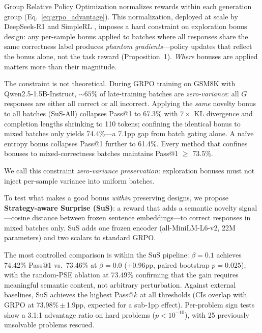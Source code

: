 \documentclass[10pt]{article}
\begin{document}
Group Relative Policy Optimization \citep[GRPO;][]{shao2024deepseekmath} normalizes rewards within each generation group (Eq.~\ref{eq:grpo_advantage}). This normalization, deployed at scale by DeepSeek-R1 \citep{guo2025deepseek} and SimpleRL \citep{zeng2025simplerl}, imposes a hard constraint on exploration bonus design: any per-sample bonus applied to batches where all responses share the same correctness label produces \emph{phantom gradients}---policy updates that reflect the bonus alone, not the task reward (Proposition~1). \emph{Where} bonuses are applied matters more than their magnitude.

The constraint is not theoretical. During GRPO training on GSM8K with Qwen2.5-1.5B-Instruct, ${\sim}65\%$ of late-training batches are \emph{zero-variance}: all $G$ responses are either all correct or all incorrect. Applying the \emph{same} novelty bonus to all batches (SuS-All) collapses Pass@1 to 67.3\% with $7{\times}$ KL divergence and completion lengths shrinking to 110 tokens; confining the identical bonus to mixed batches only yields 74.4\%---a 7.1pp gap from batch gating alone. A na\"ive entropy bonus collapses Pass@1 further to 61.4\%. Every method that confines bonuses to mixed-correctness batches maintains Pass@1 $\geq$ 73.5\%.

We call this constraint \emph{zero-variance preservation}: exploration bonuses must not inject per-sample variance into uniform batches.

To test what makes a good bonus \emph{within} preserving designs, we propose \textbf{Strategy-aware Surprise (SuS)}: a reward that adds a semantic novelty signal---cosine distance between frozen sentence embeddings---to correct responses in mixed batches only. SuS adds one frozen encoder (all-MiniLM-L6-v2, 22M parameters) and two scalars to standard GRPO.

The most controlled comparison is within the SuS pipeline: $\beta{=}0.1$ achieves 74.42\% Pass@1 vs.\ 73.46\% at $\beta{=}0.0$ (+0.96pp, paired bootstrap $p{=}0.025$), with the random-PSE ablation at 73.49\% confirming that the gain requires meaningful semantic content, not arbitrary perturbation. Against external baselines, SuS achieves the highest Pass@$k$ at all thresholds (CIs overlap with GRPO at 73.98\%\,$\pm$\,1.9pp, expected for a sub-1pp effect). Per-problem sign tests show a 3.1:1 advantage ratio on hard problems ($p < 10^{-10}$), with 25 previously unsolvable problems rescued.
\end{document}

